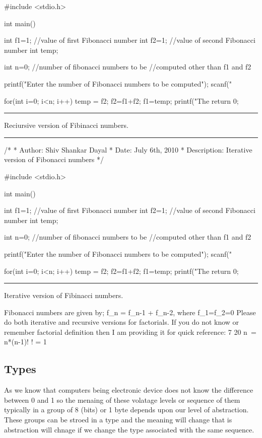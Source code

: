 #include <stdio.h>

int main()
{
  int f1=1;  //value of first Fibonacci number
  int f2=1;  //value of second Fibonacci number
  int temp;

  int n=0;  //number of fibonacci numbers to be
            //computed other than f1 and f2

  printf("Enter the number of Fibonacci numbers to be computed\n");
  scanf("%

  for(int i=0; i<n; i++)
    {
      temp = f2;
      f2=f1+f2;
      f1=temp;
      printf("The %
    }
  return 0;
}\stopCPP
{}
\hrule
\blank[force,1mm]
\startalignment[middle]
Reciursive version of Fibinacci numbers.
\stopalignment
\blank[force,1mm]\hrule\blank[force,1mm]
\startCPP
/*
 * Author: Shiv Shankar Dayal
 * Date: July 6th, 2010
 * Description: Iterative version of Fibonacci numbers
 */

#include <stdio.h>

int main()
{
  int f1=1;  //value of first Fibonacci number
  int f2=1;  //value of second Fibonacci number
  int temp;

  int n=0;  //number of fibonacci numbers to be
            //computed other than f1 and f2

  printf("Enter the number of Fibonacci numbers to be computed\n");
  scanf("%

  for(int i=0; i<n; i++)
    {
      temp = f2;
      f2=f1+f2;
      f1=temp;
      printf("The %
    }
  return 0;
}
\stopCPP
{}
\hrule
\blank[force,1mm]
\startalignment[middle]
Iterative version of Fibinacci numbers.
\stopalignment

Fibonacci numbers are given by;
\startformula
f_n = f_{n-1} + f_{n-2}, where f_1=f_2=0
\stopformula
Please do both iterative and recursive versions for factorials. If you
do not know or remember factorial definition then I am providing it
for quick reference:
7 20
\startformula
n\ = n*(n-1)!\hfill\break
\stopformula
{}
! = 1
\stopformula

\subsection{Types}
As we know that computers being electronic device does not know the
difference between 0 and 1 so the menaing of these volatage levels or
sequence of them typically in a group of 8 (bits) or 1 byte depends
upon our level of abstraction. These groups can be stroed in a type
and the meaning will change that is abstraction will chnage if we
change the type associated with the same sequence.

